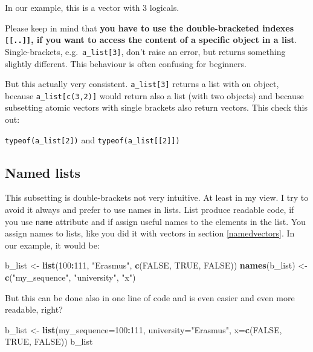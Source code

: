 \documentclass[
]{scrartcl}
\makeatletter
\newenvironment{Shaded}{\begin{snugshade}}{\end{snugshade}}
\newcommand{\AttributeTok}[1]{\textcolor[rgb]{0.13,0.29,0.53}{#1}}
\newcommand{\ConstantTok}[1]{\textcolor[rgb]{0.56,0.35,0.01}{#1}}
\newcommand{\DecValTok}[1]{\textcolor[rgb]{0.00,0.00,0.81}{#1}}
\newcommand{\FunctionTok}[1]{\textcolor[rgb]{0.13,0.29,0.53}{\textbf{#1}}}
\newcommand{\NormalTok}[1]{#1}
\newcommand{\OtherTok}[1]{\textcolor[rgb]{0.56,0.35,0.01}{#1}}
\newcommand{\SpecialCharTok}[1]{\textcolor[rgb]{0.81,0.36,0.00}{\textbf{#1}}}
\newcommand{\StringTok}[1]{\textcolor[rgb]{0.31,0.60,0.02}{#1}}
\newenvironment{kframe}{%
\medskip{}
\setlength{\fboxsep}{.8em}
 \def\at@end@of@kframe{}%
 \ifinner\ifhmode%
  \def\at@end@of@kframe{\end{minipage}}%
  \begin{minipage}{\columnwidth}%
 \fi\fi%
 \def\FrameCommand##1{\hskip\@totalleftmargin \hskip-\fboxsep
 \colorbox{shadecolor}{##1}\hskip-\fboxsep
     \hskip-\linewidth \hskip-\@totalleftmargin \hskip\columnwidth}%
 \MakeFramed {\advance\hsize-\width
   \@totalleftmargin\z@ \linewidth\hsize
   \@setminipage}}%
 {\par\unskip\endMakeFramed%
 \at@end@of@kframe}
\newenvironment{rmdblock}[1]
  {
  \begin{itemize}
  \renewcommand{\labelitemi}{
    \raisebox{-.7\height}[0pt][0pt]{
      {\setkeys{Gin}{width=3em,keepaspectratio}\texttt{[image: images/\#1]}}
    }
  }
  \setlength{\fboxsep}{1em}
  \begin{kframe}
  \item
  }
  {
  \end{kframe}
  \end{itemize}
  }
\newenvironment{geek}
    {\begin{rmdblock}{geek}}
    {\end{rmdblock}}
\makeatother
\begin{document}
In our example, this is a vector with 3 logicals.

Please keep in mind that \textbf{you have to use the double-bracketed indexes \texttt{{[}{[}..{]}{]}}, if you want to access the content of a specific object in a list}. Single-brackets, e.g.~\texttt{a\_list{[}3{]}}, don't raise an error, but returns something slightly different. This behaviour is often confusing for beginners.

\begin{geek}
But this actually very consistent. \texttt{a\_list{[}3{]}} returns a
list with on object, because \texttt{a\_list{[}c(3,2){]}} would return
also a list (with two objects) and because subsetting atomic vectors
with single brackets also return vectors. This check this out:

\texttt{typeof(a\_list{[}2{]})} and
\texttt{typeof(a\_list{[}{[}2{]}{]})}
\end{geek}

\hypertarget{namedlists}{%
\subsection{Named lists}\label{namedlists}}

This subsetting is double-brackets not very intuitive. At least in my view. I try to avoid it always and prefer to use names in lists. List produce readable code, if you use \texttt{name} attribute and if assign useful names to the elements in the list. You assign names to lists, like you did it with vectors in section \ref{namedvectors}. In our example, it would be:

\begin{Shaded}
\begin{Highlighting}[]
\NormalTok{b\_list }\OtherTok{\textless{}{-}} \FunctionTok{list}\NormalTok{(}\DecValTok{100}\SpecialCharTok{:}\DecValTok{111}\NormalTok{, }\StringTok{"Erasmus"}\NormalTok{, }\FunctionTok{c}\NormalTok{(}\ConstantTok{FALSE}\NormalTok{, }\ConstantTok{TRUE}\NormalTok{, }\ConstantTok{FALSE}\NormalTok{))}
\FunctionTok{names}\NormalTok{(b\_list) }\OtherTok{\textless{}{-}} \FunctionTok{c}\NormalTok{(}\StringTok{"my\_sequence"}\NormalTok{, }\StringTok{"university"}\NormalTok{, }\StringTok{"x"}\NormalTok{)}
\end{Highlighting}
\end{Shaded}

But this can be done also in one line of code and is even easier and even more readable, right?

\begin{Shaded}
\begin{Highlighting}[]
\NormalTok{b\_list }\OtherTok{\textless{}{-}} \FunctionTok{list}\NormalTok{(}\AttributeTok{my\_sequence=}\DecValTok{100}\SpecialCharTok{:}\DecValTok{111}\NormalTok{, }\AttributeTok{university=}\StringTok{"Erasmus"}\NormalTok{, }\AttributeTok{x=}\FunctionTok{c}\NormalTok{(}\ConstantTok{FALSE}\NormalTok{, }\ConstantTok{TRUE}\NormalTok{, }\ConstantTok{FALSE}\NormalTok{))}
\NormalTok{b\_list}
\end{Highlighting}
\end{Shaded}
\end{document}

